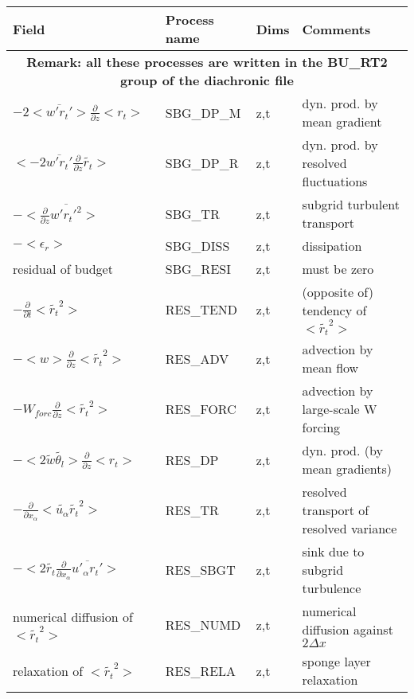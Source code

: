 \begin{longtable}[c]{|p{}|p{}|p{}|p{}|}
\hline
Field & Process name & Dims & Comments \\
\hline \hline
\endhead
\multicolumn{4}{|c|}{\textbf{Remark: all these processes are written in the BU\_RT2 group of the diachronic file}} \\
\hline
\endfoot
$- 2 <\overline{w'r_t'}>\frac{\partial }{\partial z}<r_t>$             & SBG\_DP\_M & z,t & dyn. prod. by mean gradient \\\hline
$<-2 \overline{w'r_t'}\frac{\partial}{\partial z}\tilde{r_t}>$         & SBG\_DP\_R & z,t & dyn. prod. by resolved fluctuations\\\hline
$-<\frac{\partial}{\partial z}\overline{w'r_t'^2}>$                    & SBG\_TR    & z,t & subgrid turbulent transport\\\hline
$-<\epsilon_r>$                                                        & SBG\_DISS  & z,t & dissipation \\\hline
{\rm residual of budget}                                               & SBG\_RESI  & z,t & must be zero \\\hline
$-\frac{\partial }{\partial t}<\tilde{r_t}^2>$                         & RES\_TEND  & z,t & (opposite of) tendency of $<\tilde{r_t}^2>$\\\hline
$-<w>\frac{\partial}{\partial z}<\tilde{r_t}^2>$                       & RES\_ADV   & z,t & advection by mean flow\\\hline
$-W_{forc}\frac{\partial}{\partial z}<\tilde{r_t}^2>$                  & RES\_FORC  & z,t & advection by large-scale W forcing\\\hline
$-< 2 \tilde{w}\tilde{\theta_l}>\frac{\partial }{\partial z}<r_t>$     & RES\_DP    & z,t & dyn. prod. (by mean gradients) \\\hline
$-\frac{\partial}{\partial x_\alpha} <\tilde{u_\alpha} \tilde{r_t}^2>$ & RES\_TR    & z,t & resolved transport of resolved variance \\\hline
$- <2 \tilde{r_t}\frac{\partial}{\partial x_\alpha}\overline{u'_\alpha r_t'}>$ & RES\_SBGT & z,t & sink due to subgrid turbulence \\\hline
{\rm numerical diffusion of } $<\tilde{r_t}^2>$                        & RES\_NUMD  & z,t & numerical diffusion against $2\Delta x$ \\\hline
{\rm relaxation of }$<\tilde{r_t}^2>$                                  & RES\_RELA  & z,t & sponge layer relaxation \\\hline

\end{longtable}
